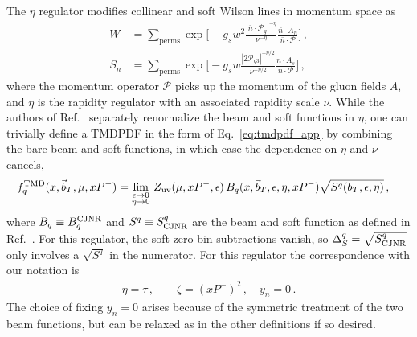 \documentclass[11pt,a4paper]{article}
\DeclareRobustCommand{\eq}[1]{Eq.~\eqref{eq:#1}}
\DeclareRobustCommand{\mycite}[1]{Ref.~\cite{#1}}
\newcommand{\eps}{\epsilon}
\newcommand{\cP}{\mathcal{P}}
\newcommand{\bn}{{\bar{n}}}
\newcommand\TMD{\mathrm{TMD}}
\newcommand{\bt}{\vec b_T}
\begin{document}
The $\eta$ regulator \cite{Chiu:2011qc,Chiu:2012ir} modifies collinear and soft Wilson lines
in momentum space as
\begin{align} \label{eq:eta_regulator}
W &= \sum_\text{perms} \exp\biggl[ - g_s w^2 \frac{|\bn \cdot \cP_g|^{-\eta}}{\nu^{-\eta}} \frac{\bn \cdot A_n}{\bn \cdot \cP} \biggr]
\,,\\
S_n &= \sum_\text{perms} \exp\biggl[ - g_s w \frac{|2 \cP_{g3}|^{-\eta/2}}{\nu^{-\eta/2}} \frac{n \cdot A_s}{n \cdot \cP} \biggr]
\,,\end{align}
where the momentum operator $\cP$ picks up the momentum of the gluon fields $A$, and $\eta$ is the rapidity regulator with an associated rapidity scale $\nu$.
While the authors of \mycite{Chiu:2012ir} separately renormalize the beam and soft functions in $\eta$, one can trivially define a TMDPDF in the form of \eq{tmdpdf_app} by combining the bare beam and soft functions, in which case the dependence on $\eta$ and $\nu$ cancels,
\begin{align} \label{eq:tmdpdf_eta}
f^\TMD_q(x, \bt, \mu, x P^-) &=  \lim_{\substack{\eps\to0 \\ \eta\to0}} \,
Z_{\rm uv}(\mu,x P^-,\eps) \, B_{q}(x, \bt, \eps, \eta, x P^-) \sqrt{S^q(b_T,\eps,\eta)}
\,,\end{align}
where $B_q \equiv B_q^{\rm CJNR}$ and $S^q \equiv S^q_{\rm CJNR}$ are the beam and soft function as defined in \mycite{Chiu:2012ir}.
For this regulator, the soft zero-bin subtractions vanish, so $\Delta_S^q=\sqrt{S^q_{\rm CJNR}}$ only involves a $\sqrt{S^q}$ in the numerator.
For this regulator the correspondence with our notation is
\begin{align}
\eta = \tau \,,\qquad \zeta = (x P^-)^2 \,, \quad y_n = 0
\,.\end{align}
The choice of fixing $y_n=0$ arises because of the symmetric treatment of the two beam functions, but can be relaxed as in the other definitions if so desired.
\end{document}
